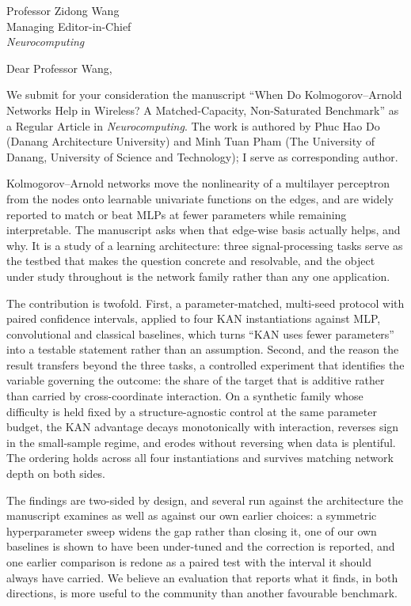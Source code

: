 \documentclass[11pt]{letter}
\begin{document}
\begin{letter}{Professor Zidong Wang\\Managing Editor-in-Chief\\\emph{Neurocomputing}}
\opening{Dear Professor Wang,}

We submit for your consideration the manuscript ``When Do Kolmogorov--Arnold Networks Help in
Wireless? A Matched-Capacity, Non-Saturated Benchmark'' as a Regular Article in
\emph{Neurocomputing}. The work is authored by Phuc Hao Do (Danang Architecture
University) and Minh Tuan Pham (The University of Danang, University of Science and
Technology); I serve as corresponding author.

Kolmogorov--Arnold networks move the nonlinearity of a multilayer perceptron from the nodes
onto learnable univariate functions on the edges, and are widely reported to match or beat
MLPs at fewer parameters while remaining interpretable. The manuscript asks when that edge-wise
basis actually helps, and why. It is a study of a learning architecture: three signal-processing
tasks serve as the testbed that makes the question concrete and resolvable, and the object under
study throughout is the network family rather than any one application.

The contribution is twofold. First, a parameter-matched, multi-seed protocol with paired
confidence intervals, applied to four KAN instantiations against MLP, convolutional and
classical baselines, which turns ``KAN uses fewer parameters'' into a testable statement rather
than an assumption. Second, and the reason the result transfers beyond the three tasks, a
controlled experiment that identifies the variable governing the outcome: the share of the
target that is additive rather than carried by cross-coordinate interaction. On a synthetic
family whose difficulty is held fixed by a structure-agnostic control at the same parameter
budget, the KAN advantage decays monotonically with interaction, reverses sign in the
small-sample regime, and erodes without reversing when data is plentiful. The ordering holds
across all four instantiations and survives matching network depth on both sides.

The findings are two-sided by design, and several run against the architecture the manuscript
examines as well as against our own earlier choices: a symmetric hyperparameter sweep widens
the gap rather than closing it, one of our own baselines is shown to have been under-tuned and
the correction is reported, and one earlier comparison is redone as a paired test with the
interval it should always have carried. We believe an evaluation that reports what it finds,
in both directions, is more useful to the community than another favourable benchmark.


\end{letter}
\end{document}
